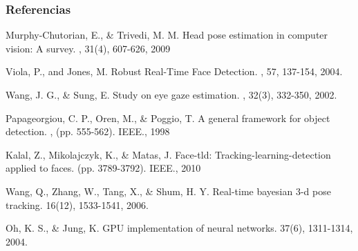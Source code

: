 \documentclass[10pt, compress]{beamer}
\begin{document}
\begin{frame}[fragile]
	\frametitle{Referencias}
		\begin{thebibliography}{14}
			
			Murphy-Chutorian, E., \& Trivedi, M. M. 
			\newblock Head pose estimation in computer vision: A survey.
			, 31(4), 607-626, 2009
			
			Viola, P.,  and Jones, M.
			\newblock Robust Real-Time Face Detection.
			, 57, 137-154, 2004.
			
			Wang, J. G., \& Sung, E.  
			\newblock Study on eye gaze estimation.
			, 32(3), 332-350, 2002.
			
			Papageorgiou, C. P., Oren, M., \& Poggio, T. 
			\newblock A general framework for object detection. 
			, (pp. 555-562). IEEE., 1998
			
			Kalal, Z., Mikolajczyk, K., \& Matas, J. 
			\newblock Face-tld: Tracking-learning-detection applied to faces. 
			 (pp. 3789-3792). IEEE., 2010
			
			Wang, Q., Zhang, W., Tang, X., \& Shum, H. Y. 
			\newblock Real-time bayesian 3-d pose tracking. 
			 16(12), 1533-1541, 2006.
			
			Oh, K. S., \& Jung, K.  
			\newblock GPU implementation of neural networks.
			 37(6), 1311-1314, 2004.
			
		\end{thebibliography}
	
\end{frame}



\end{document}
